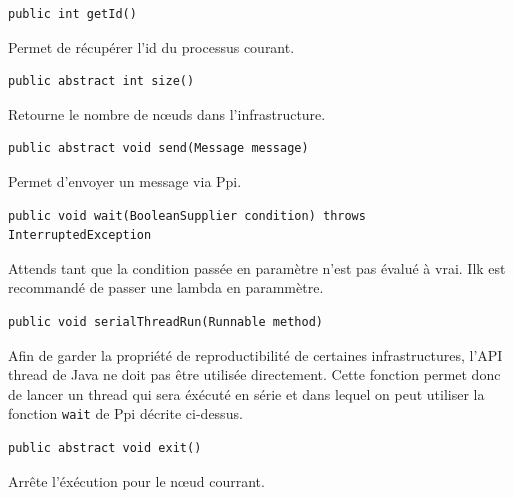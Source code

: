 \documentclass{article}
\begin{document}
\noindent\begin{minipage}{\linewidth}
\begin{lstlisting}
public int getId()
\end{lstlisting}
Permet de récupérer l'id du processus courant.
\bigskip
\end{minipage}

\noindent\begin{minipage}{\linewidth}
\begin{lstlisting}
public abstract int size()
\end{lstlisting}
Retourne le nombre de n\oe uds dans l'infrastructure.
\bigskip
\end{minipage}

\noindent\begin{minipage}{\linewidth}
\begin{lstlisting}
public abstract void send(Message message)
\end{lstlisting}
Permet d'envoyer un message via Ppi.
\bigskip
\end{minipage}

\noindent\begin{minipage}{\linewidth}
\begin{lstlisting}
public void wait(BooleanSupplier condition) throws InterruptedException
\end{lstlisting}
Attends tant que la condition passée en paramètre n'est pas évalué à vrai. Ilk est recommandé de
passer une lambda en parammètre.
\bigskip
\end{minipage}

\noindent\begin{minipage}{\linewidth}
\begin{lstlisting}
public void serialThreadRun(Runnable method)
\end{lstlisting}
Afin de garder la propriété de reproductibilité de certaines infrastructures, l'API thread de Java
ne doit pas être utilisée directement. Cette fonction permet donc de lancer un thread qui sera
éxécuté en série et dans lequel on peut utiliser la fonction \lstinline{wait} de Ppi décrite ci-dessus.
\bigskip
\end{minipage}

\noindent\begin{minipage}{\linewidth}
\begin{lstlisting}
public abstract void exit()
\end{lstlisting}
Arrête l'éxécution pour le n\oe ud courrant.
\bigskip
\end{minipage}
\end{document}
